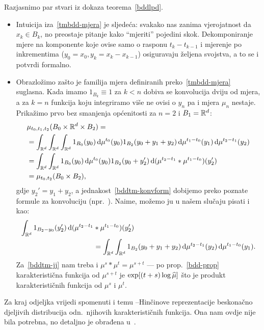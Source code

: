 \documentclass[main.tex]{subfiles}
\begin{document}
\begin{komentar} \label{tmbdd-komentar}
	Razjasnimo par stvari iz dokaza teorema~\ref{bddlpd}.
	\begin{itemize}
		\item Intuicija iza~\eqref{tmbdd-mjera} je sljedeća: svakako nas zanima
		      vjerojatnost da \( x_k \in B_k \), no preostaje pitanje kako \enquote{mjeriti} pojedini skok.
		      Dekomponiranje mjere na komponente koje ovise samo o rasponu \( t_k-t_{k-1} \) i mjerenje po
		      inkrementima (\( y_0=x_0, y_k = x_k-x_{k-1} \)) osiguravaju željena svojstva, a to se i
		      potvrdi formalno.

		\item Obrazložimo zašto je familija mjera definiranih preko~\eqref{tmbdd-mjera} suglasna.
		      Kada imamo \( 1_{B_k} \equiv 1 \) za \( k < n \) dobiva se konvolucija dviju od mjera, a za \( k = n \)
		      funkcija koju integriramo više ne ovisi o \( y_n \) pa i mjera \( \mu_n \) nestaje. Prikažimo prvo bez smanjenja općenitosti za \( n = 2 \) i \( B_1 = \mathbb{R}^d \):
		      \begin{align}
			       & \mu_{t_0, t_1, t_2}(B_0 \times \mathbb{R}^d \times B_2) =                                                                                         \\
			       & = \int_{\mathbb{R}^d}\int_{\mathbb{R}^d}\int_{\mathbb{R}^d} 1_{B_0}(y_0) \,\mathrm d \mu^{t_0} (y_0) 1_{B_2}(y_0+y_1+y_2) \,\mathrm d \mu^{t_1-t_0}(y_1) \,\mathrm d \mu^{t_2-t_1}(y_2)      \\
			       & = \int_{\mathbb{R}^d} \int_{\mathbb{R}^d} 1_{B_0}(y_0) \,\mathrm d \mu^{t_0}(y_0) 1_{B_2}(y_0+y_2') \,\mathrm d (\mu^{t_2-t_1}*\mu^{t_1-t_0})(y_2')  \label{bddtm-konvform} \\
			       & = \mu_{t_0, t_2}(B_0 \times B_2) \label{bddtm-jj},
		      \end{align}
		      gdje \( y_2' = y_1 + y_2 \), a jednakost~\eqref{bddtm-konvform} dobijemo preko poznate formule za konvoluciju (npr.~\cite[,~(6)]{sarapa}). Naime, možemo ju u našem slučaju pisati
		      i kao:
		      \begin{equation}
			      \begin{aligned}
				      \int_{\mathbb{R}^d} 1_{B_2-y_0} (y_2')\,\mathrm d (\mu^{t_2-t_1} & * \mu^{t_1-t_0})(y_2')                                                                       \\
				                                                      & =  \int_{\mathbb{R}^d} \int_{\mathbb{R}^d} 1_{B_2}(y_0+y_1+y_2) \,\mathrm d \mu^{t_2-t_1}(y_2) \,\mathrm d \mu^{t_1-t_0}(y_1).
			      \end{aligned}
		      \end{equation}
		      Za~\eqref{bddtm-jj} nam treba i \( \mu^s * \mu^t = \mu^{s+t} \) --- po prop.~\ref{bdd-prop} karakteristična funkcija od
		      \( \mu^{s+t} \) je \( \exp[(t+s) \log \widehat{\mu}] \) što je produkt karakterističnih funkcija od \( \mu^s \) i \( \mu^t \).
	\end{itemize}
\end{komentar}

Za kraj odjeljka vrijedi spomenuti i temu \levy --Hinčinove reprezentacije beskonačno djeljivih distribucija odn.\
njihovih karakterističnih funkcija. Ona nam ovdje nije bila potrebna, no detaljno je
obrađena u~\cite[\textsection 8]{sato}.
\end{document}
